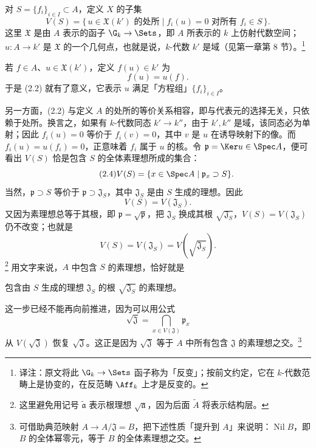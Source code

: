 对 $S=\{f_i\}_{i\in I}\subset A$，定义 $X$ 的子集
\begin{equation}\tag{2.2}
V(S)=\{\,u\in\mathfrak X(k')\text{ 的处所}\mid f_i(u)=0\text{ 对所有 }f_i\in S\,\}.
\end{equation}
这里 $\mathfrak X$ 是由 $A$ 表示的函子 $\G_k\to\Sets$，即 $A$ 所表示的 $k$ 上仿射代数空间；$u:A\to k'$ 是 $\mathfrak X$ 的一个几何点，也就是说，$k$-代数 $k'$ 是域（见第一章第 8 节）。\footnote{译注：原文将此 $\G_k\to\Sets$ 函子称为「反变」；按前文约定，它在 $k$-代数范畴上是协变的，在反范畴 $\Aff_k$ 上才是反变的。}

若 $f\in A$、$u\in\mathfrak X(k')$，定义 $f(u)\in k'$ 为
\begin{equation}\tag{2.3}
f(u)=u(f).
\end{equation}
于是 (2.2) 就有了意义，它表示 $u$ 满足「方程组」$\{f_i\}_{i\in I}$。

另一方面，(2.2) 与定义 $A$ 的处所的等价关系相容，即与代表元的选择无关，只依赖于处所。换言之，如果有 $k$-代数同态 $k'\to k''$，由于 $k',k''$ 是域，该同态必为单射；因此 $f_i(u)=0$ 等价于 $f_i(v)=0$，其中 $v$ 是 $u$ 在诱导映射下的像。而 $f_i(u)=u(f_i)=0$，正意味着 $f_i$ 属于 $u$ 的核。令 $\mathfrak p=\Ker u\in\Spec A$，便可看出 $V(S)$ 恰是包含 $S$ 的全体素理想所成的集合：
\begin{equation}\tag{2.4}
V(S)=\{x\in\Spec A\mid\mathfrak p_x\supset S\}.
\end{equation}
当然，$\mathfrak p\supset S$ 等价于 $\mathfrak p\supset\mathfrak J_S$，其中 $\mathfrak J_S$ 是由 $S$ 生成的理想。因此
\begin{equation}\tag{2.5}
V(S)=V(\mathfrak J_S).
\end{equation}
又因为素理想总等于其根，即 $\mathfrak p=\sqrt{\mathfrak p}$，把 $\mathfrak J_S$ 换成其根 $\sqrt{\mathfrak J_S}$，$V(S)=V(\mathfrak J_S)$ 仍不改变；也就是
\begin{equation}\tag{2.6}
V(S)=V(\mathfrak J_S)=V(\sqrt{\mathfrak J_S}).
\end{equation}
\footnote{这里避免用记号 $\widetilde{\mathfrak a}$ 表示根理想 $\sqrt{\mathfrak a}$，因为后面 $\widetilde A$ 将表示结构层。}
用文字来说，$A$ 中包含 $S$ 的素理想，恰好就是

包含由 $S$ 生成的理想 $\mathfrak J_S$ 的根 $\sqrt{\mathfrak J_S}$ 的素理想。

这一步已经不能再向前推进，因为可以用公式
\begin{equation}\tag{2.7}
\sqrt{\mathfrak J}=\bigcap_{x\in V(\mathfrak J)}\mathfrak p_x
\end{equation}
从 $V(\sqrt{\mathfrak J})$ 恢复 $\sqrt{\mathfrak J}$。这正是因为 $\sqrt{\mathfrak J}$ 等于 $A$ 中所有包含 $\mathfrak J$ 的素理想之交。\footnote{可借助典范映射 $A\to A/\mathfrak J=B$，把下述性质「提升到 $A$」来说明：$\operatorname{Nil}B$，即 $B$ 的全体幂零元，等于 $B$ 的全体素理想之交。}

